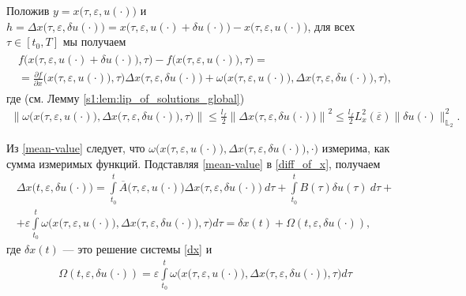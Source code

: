 \documentclass[../main.tex]{subfiles}
\begin{document}
Положив $y = x\big(\tau,\varepsilon, u(\cdot)\big)$ и $h = \Delta x\big(\tau, \varepsilon, \delta u(\cdot)\big) = x\big(\tau,\varepsilon, u(\cdot) + \delta u(\cdot)\big) - x\big(\tau,\varepsilon, u(\cdot)\big)$, для всех $\tau \in [t_0,T]$ мы получаем
\begin{gather}\label{mean-value}
 \begin{gathered}
 f\Big(x\big(\tau,\varepsilon, u(\cdot) + \delta u(\cdot)\big),\tau\Big) -
 f\Big(x\big(\tau,\varepsilon, u(\cdot)\big),\tau\Big) = \\ = 
 \frac{\partial f}{\partial x} \Big(x\big(\tau,\varepsilon, u(\cdot)\big), \tau\Big) 
 \Delta x\big(\tau, \varepsilon, \delta u(\cdot)\big) + 
 \omega\Big(x\big(\tau,\varepsilon, u(\cdot)\big),\Delta x\big(\tau, \varepsilon, \delta u(\cdot)\big),\tau\Big),
 \end{gathered}
\end{gather}
где (см. Лемму \ref{s1:lem:lip_of_solutions_global})
\begin{gather}\label{omega_est}
 \left\|\omega\Big(x\big(\tau,\varepsilon, u(\cdot)\big),\Delta x\big(\tau, \varepsilon, \delta u(\cdot)\big),\tau\Big)\right\| 
 \leqslant
 \frac{l_f}{2} \left\|\Delta x\big(\tau, \varepsilon, \delta u(\cdot)\big)\right\|^2 
 \leqslant
 \frac{l_f}{2} L_x^2(\overline{\varepsilon}) \|\delta u(\cdot)\|_{\mathbb{L}_2}^2.
\end{gather}

Из \eqref{mean-value} следует, что $\omega\Big(x\big(\tau,\varepsilon, u(\cdot)\big),\Delta x\big(\tau, \varepsilon, \delta u(\cdot)\big),\cdot\big)$ измерима, как сумма измеримых функций.
Подставляя \eqref{mean-value} в \eqref{diff_of_x}, получаем
\begin{gather*}
 \Delta x\big(t, \varepsilon, \delta u(\cdot)\big)
 = \int\limits_{t_0}^t 
 \overline{A}\big(\tau,\varepsilon,u(\cdot)\big) 
 \Delta x\big(\tau, \varepsilon, \delta u(\cdot)\big)\ d\tau + 
 \int\limits_{t_0}^t B(\tau) \delta u(\tau)\ d\tau + \\ +
 \varepsilon\int\limits_{t_0}^t \omega\Big(x\big(\tau,\varepsilon, u(\cdot)\big),\Delta x\big(\tau, \varepsilon, \delta u(\cdot)\big),\tau\Big) d\tau = 
 \delta x(t) + \Omega(t,\varepsilon, \delta u(\cdot)),
\end{gather*}
где $\delta x(t)$ --- это решение системы \eqref{dx} и
\begin{gather*}
 \Omega(t,\varepsilon, \delta u(\cdot)) = \varepsilon\int\limits_{t_0}^t 
 \omega\Big(x\big(\tau,\varepsilon, u(\cdot)\big),\Delta x\big(\tau, \varepsilon, \delta u(\cdot)\big),\tau\Big) d\tau
\end{gather*}
\end{document}
